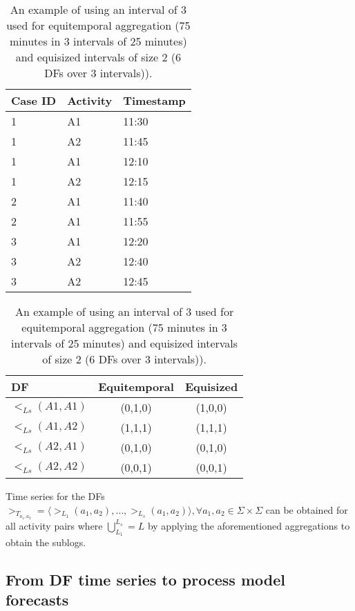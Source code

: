 \begin{table}[htbp]
   \begin{minipage}{.5\textwidth}
   	\centering
    \begin{tabular}{|l|l|l|}
    \toprule
    {Case ID} & Activity &Timestamp \\
    \midrule
    1     & A1    & 11:30 \\
    1     & A2    & 11:45 \\
    1     & A1    & 12:10 \\
    1     & A2    & 12:15 \\
    \midrule
    2     & A1    & 11:40 \\
    2     & A1    & 11:55 \\
    \midrule
    3     & A1    & 12:20 \\
    3     & A2    & 12:40 \\
    3     & A2    & 12:45 \\
    \bottomrule
    \end{tabular}
    \caption{Example event log with 3 traces and 2 activities.}
\label{tab:eventlog}
\end{minipage}
  \begin{minipage}{.5\textwidth}
  	\centering
    \begin{tabular}{|l|c|c|}
    \toprule
    DF    & Equitemporal  & Equisized \\
    \midrule
    $<_{Ls}(A1,A1)$ & (0,1,0) & (1,0,0) \\
    $<_{Ls}(A1,A2)$ & (1,1,1) & (1,1,1) \\
    $<_{Ls}(A2,A1)$ & (0,1,0) & (0,1,0) \\
    $<_{Ls}(A2,A2)$ & (0,0,1) & (0,0,1) \\
    \bottomrule
    \end{tabular}
  \caption{An example of using an interval of 3 used for equitemporal aggregation (75 minutes in 3 intervals of 25 minutes) and equisized intervals of size 2 (6 DFs over 3 intervals)).}
  \label{tab:aggregation}
 \end{minipage}%
\end{table}%

Time series for the DFs $>_{T_{a_1,a_2}}=\langle >_{L_1}(a_1,a_2),\dots,>_{L_s}(a_1,a_2)\rangle, \forall a_1,a_2\in \Sigma\times\Sigma$ can be obtained for all activity pairs where $\bigcup^{L_s}_{L_1}=L$ by applying the aforementioned aggregations to obtain the sublogs.

\subsection{From DF time series to process model forecasts}

